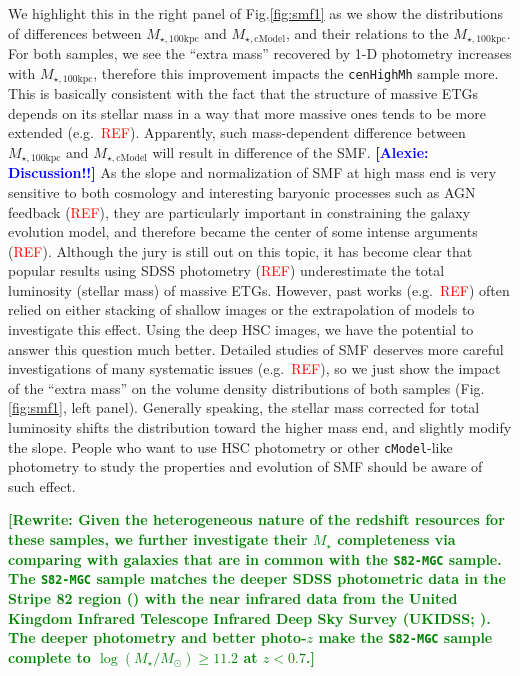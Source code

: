 \documentclass{emulateapj}
\def\cmodel{\texttt{cModel}}
\def\rbcg{\texttt{cenHighMh}}
\def\mstar{{$M_{\star}$}}
\def\logms{{$\log (M_{\star}/M_{\odot})$}}
\def\mtot{{$M_{\star,100\mathrm{kpc}}$}}
\def\mcmodel{{$M_{\star,\mathrm{cModel}}$}}
\newcommand{\addref}{{\textcolor{red}{REF}}}
\newcommand{\alexie}[1]{\textcolor{blue}{\textbf{[Alexie: #1]}}}
\newcommand{\rewrite}[1]{\textcolor{green}{\textbf{[Rewrite: #1]}}}
\begin{document}
\begin{CJK*}{UTF8}{gbsn}
We highlight this in the right panel of Fig.\ref{fig:smf1} as we show the 
    distributions of differences between \mtot{} and \mcmodel{}, and their relations 
    to the \mtot{}.  
    For both samples, we see the ``extra mass'' recovered by 1-D photometry 
    increases with \mtot{}, therefore this improvement impacts the \rbcg{}
    sample more.  
    This is basically consistent with the fact that the structure of massive ETGs 
    depends on its stellar mass in a way that more massive ones tends to be 
    more extended (e.g.\ \addref).  
    Apparently, such mass-dependent difference between \mtot{} and \mcmodel{} will 
    result in difference of the SMF. 
    \alexie{Discussion!!} As the slope and normalization of SMF at high mass end is very sensitive 
    to both cosmology and interesting baryonic processes such as AGN feedback
    (\addref), they are particularly important in constraining the galaxy evolution
    model, and therefore became the center of some intense arguments (\addref).  
    Although the jury is still out on this topic, it has become clear that 
    popular results using SDSS photometry (\addref) underestimate the total 
    luminosity (stellar mass) of massive ETGs.  
    However, past works (e.g.\ \addref) often relied on either stacking of 
    shallow images or the extrapolation of models to investigate this effect. 
    Using the deep HSC images, we have the potential to answer this question 
    much better. 
    Detailed studies of SMF deserves more careful investigations of many 
    systematic issues (e.g.\ \addref), so we just show the impact of the 
    ``extra mass'' on the volume density distributions of both samples 
    (Fig.\ref{fig:smf1}, left panel).  
    Generally speaking, the stellar mass corrected for total luminosity 
    shifts the distribution toward the higher mass end, and slightly modify
    the slope. 
    People who want to use HSC photometry or other \cmodel{}-like photometry to 
    study the properties and evolution of SMF should be aware of such effect.
    
    
    \rewrite{Given the heterogeneous nature of the redshift resources for these samples, we 
    further investigate their \mstar{} completeness via comparing with galaxies that are 
    in common with the \texttt{S82-MGC} sample. 
    The \texttt{S82-MGC} sample matches the deeper SDSS photometric data in the Stripe 82 
    region (\citealt{Annis2014}) with the near infrared data from the United Kingdom 
    Infrared Telescope Infrared Deep Sky Survey (UKIDSS; \citealt{Lawrence2007}). 
    The deeper photometry and better photo-$z$ make the \texttt{S82-MGC} sample complete 
    to \logms{}$\geq 11.2$ at $z<0.7$.}  
    

\end{CJK*}
\end{document}
